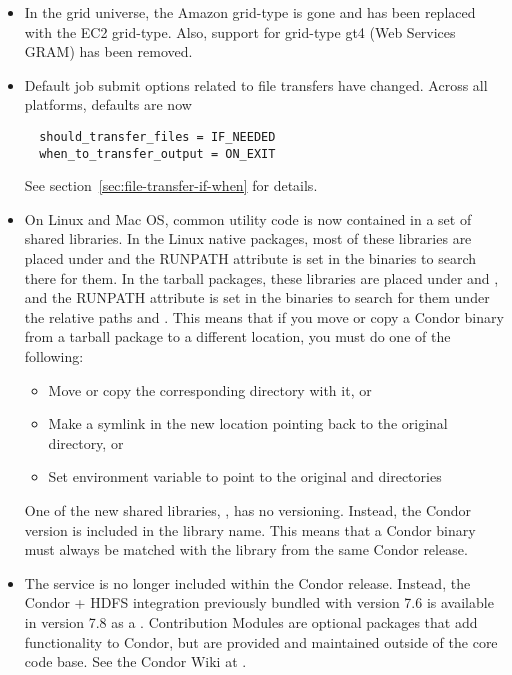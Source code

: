 \begin{itemize}

\item In the grid universe, the Amazon grid-type is gone and has been replaced
	with the EC2 grid-type.  Also, support for grid-type gt4 (Web Services
	GRAM) has been removed.

\item Default job submit options related to file transfers have changed. 
Across all platforms, defaults are now
\begin{verbatim}
  should_transfer_files = IF_NEEDED
  when_to_transfer_output = ON_EXIT
\end{verbatim}
See section~\ref{sec:file-transfer-if-when} for details.

\item  On Linux and Mac OS, common utility code is now contained in a set of
shared libraries. In the Linux native packages, most of these libraries
are placed under  and the RUNPATH attribute is set in
the binaries to search there for them.
In the tarball packages, these libraries are placed under  and
, and the RUNPATH attribute is set in the binaries to search
for them under the relative paths  and .
This means that if you move or copy a Condor binary from a tarball
package to a different location, you must do one of the following:
\begin{itemize}
	\item Move or copy the corresponding  directory with it, or
  \item Make a symlink in the new location pointing back to the original 
  directory, or
  \item Set environment variable  to point to the original  and 
  directories
\end{itemize}
One of the new shared libraries, , has no 
versioning. Instead, the Condor version is included in the library name.
This means that a Condor binary must always be matched with the
 library from the same Condor release.


\item  The  service is no longer included within the Condor
	release.  Instead, the Condor + HDFS integration previously bundled with
	version 7.6 is available in version 7.8 as a .
	Contribution Modules are optional packages that add functionality to
	Condor, but are provided and maintained outside of the core code base.  See
	the Condor Wiki at
	.


\end{itemize}

